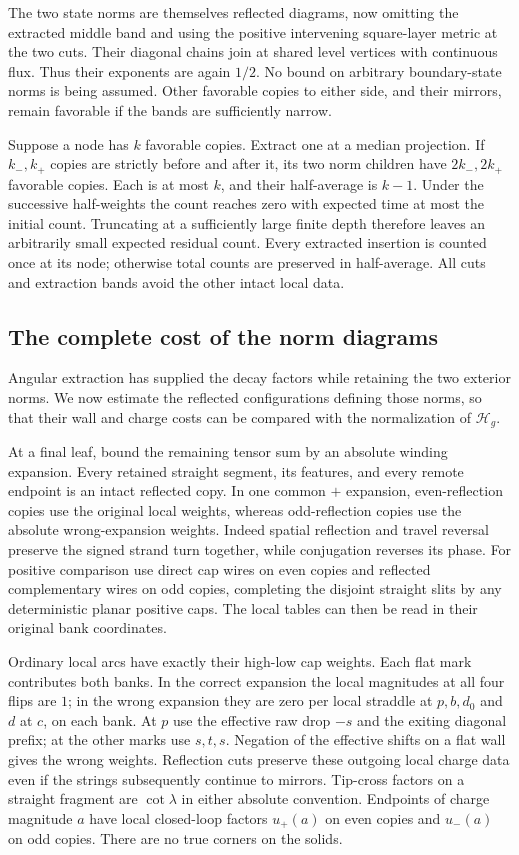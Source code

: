 The two state norms are themselves reflected diagrams, now omitting
the extracted middle band and using the positive intervening
square-layer metric at the two cuts.  Their diagonal chains join at
shared level vertices with continuous flux.  Thus their exponents
are again $1/2$.  No bound on arbitrary boundary-state norms is being
assumed.  Other favorable copies to either side, and their mirrors,
remain favorable if the bands are sufficiently narrow.

Suppose a node has $k$ favorable copies.  Extract one at a median
projection.  If $k_-,k_+$ copies are strictly before and after it, its
two norm children have $2k_-,2k_+$ favorable copies.  Each is at most
$k$, and their half-average is $k-1$.  Under the successive half-weights
the count reaches zero with expected time at most the initial count.
Truncating at a sufficiently large finite depth therefore leaves an
arbitrarily small expected residual count.  Every extracted insertion
is counted once at its node; otherwise total counts are preserved in
half-average.  All cuts and extraction bands avoid the other intact
local data.

\subsection{The complete cost of the norm diagrams}

Angular extraction has supplied the decay factors while retaining the
two exterior norms.  We now estimate the reflected configurations
defining those norms, so that their wall and charge costs can be
compared with the normalization of $\mathcal H_g$.

At a final leaf, bound the remaining tensor sum by an absolute winding
expansion.  Every retained straight segment, its features, and every
remote endpoint is an intact reflected copy.  In one common $+$
expansion, even-reflection copies use the original local weights,
whereas odd-reflection copies use the absolute wrong-expansion
weights.  Indeed spatial reflection and travel reversal preserve the
signed strand turn together, while conjugation reverses its phase.
For positive comparison use direct cap wires on even copies and
reflected complementary wires on odd copies, completing the disjoint
straight slits by any deterministic planar positive caps.  The local
tables can then be read in their original bank coordinates.

Ordinary local arcs have exactly their high-low cap weights.  Each
flat mark contributes both banks.  In the correct expansion the local
magnitudes at all four flips are $1$; in the wrong expansion they are
zero per local straddle at $p,b,d_0$ and $d$ at $c$, on each bank.
At $p$ use the effective raw drop $-s$ and the exiting diagonal prefix;
at the other marks use $s,t,s$.  Negation of the effective shifts on
a flat wall gives the wrong weights.  Reflection cuts preserve these
outgoing local charge data even if the strings subsequently continue
to mirrors.  Tip-cross factors on a straight fragment are $\cot\lambda$
in either absolute convention.  Endpoints of charge magnitude $a$
have local closed-loop factors $u_+(a)$ on even copies and $u_-(a)$
on odd copies.  There are no true corners on the solids.

